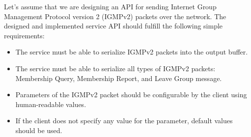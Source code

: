 Let’s assume that we are designing an API for sending Internet Group Management Protocol version 2 (IGMPv2)
packets over the network.
The designed and implemented service API should fulfill the following simple requirements:

\begin{itemize}
    \item
    The service must be able to serialize IGMPv2 packets into the output buffer.
    \item
    The service must be able to serialize all types of IGMPv2 packets: Membership Query, Membership Report,
    and Leave Group message.
    \item
    Parameters of the IGMPv2 packet should be configurable by the client using human-readable values.
    \item
    If the client does not specify any value for the parameter, default values should be used.
\end{itemize}
